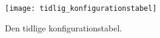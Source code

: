 \begin{figure}
\texttt{[image: tidlig\_konfigurationstabel]}
\caption{Den tidlige konfigurationstabel.}
\label{tidlig_konfigurationstabel}
\end{figure}
